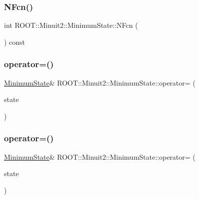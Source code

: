 \subsubsection{\texorpdfstring{NFcn()}{NFcn()}\hspace{0.1cm}{\footnotesize\ttfamily [3/3]}}
{\footnotesize\ttfamily int R\+O\+O\+T\+::\+Minuit2\+::\+Minimum\+State\+::\+N\+Fcn (\begin{DoxyParamCaption}{ }\end{DoxyParamCaption}) const\hspace{0.3cm}{\ttfamily [inline]}}

\mbox{\label{classROOT_1_1Minuit2_1_1MinimumState_ad0d12f94b8f1adca2b2c4279006f82e4}} 
\subsubsection{\texorpdfstring{operator=()}{operator=()}\hspace{0.1cm}{\footnotesize\ttfamily [1/3]}}
{\footnotesize\ttfamily \mbox{\hyperlink{classROOT_1_1Minuit2_1_1MinimumState}{Minimum\+State}}\& R\+O\+O\+T\+::\+Minuit2\+::\+Minimum\+State\+::operator= (\begin{DoxyParamCaption}\item[{const \mbox{\hyperlink{classROOT_1_1Minuit2_1_1MinimumState}{Minimum\+State}} \&}]{state }\end{DoxyParamCaption})\hspace{0.3cm}{\ttfamily [inline]}}

\mbox{\label{classROOT_1_1Minuit2_1_1MinimumState_ad0d12f94b8f1adca2b2c4279006f82e4}} 
\subsubsection{\texorpdfstring{operator=()}{operator=()}\hspace{0.1cm}{\footnotesize\ttfamily [2/3]}}
{\footnotesize\ttfamily \mbox{\hyperlink{classROOT_1_1Minuit2_1_1MinimumState}{Minimum\+State}}\& R\+O\+O\+T\+::\+Minuit2\+::\+Minimum\+State\+::operator= (\begin{DoxyParamCaption}\item[{const \mbox{\hyperlink{classROOT_1_1Minuit2_1_1MinimumState}{Minimum\+State}} \&}]{state }\end{DoxyParamCaption})\hspace{0.3cm}{\ttfamily [inline]}}

